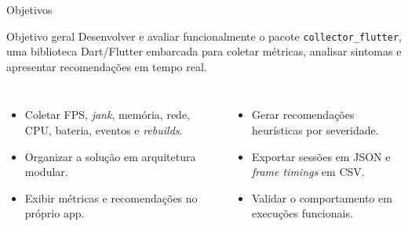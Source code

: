 \documentclass[aspectratio=169,10pt]{beamer}
\newcommand{\collectorFlutter}{\texttt{collector\_flutter}}
\newcommand{\jank}{\textit{jank}}
\newcommand{\rebuilds}{\textit{rebuilds}}
\begin{document}
\begin{frame}{Objetivos}
\begin{accentbox}{Objetivo geral}
Desenvolver e avaliar funcionalmente o pacote \collectorFlutter{}, uma biblioteca Dart/Flutter embarcada para coletar métricas, analisar sintomas e apresentar recomendações em tempo real.
\end{accentbox}
\vspace{1mm}
\begin{columns}[T,onlytextwidth]
  \begin{itemize}
    \item Coletar FPS, \jank{}, memória, rede, CPU, bateria, eventos e \rebuilds{}.
    \item Organizar a solução em arquitetura modular.
    \item Exibir métricas e recomendações no próprio app.
  \end{itemize}
  \begin{itemize}
    \item Gerar recomendações heurísticas por severidade.
    \item Exportar sessões em JSON e \textit{frame timings} em CSV.
    \item Validar o comportamento em execuções funcionais.
  \end{itemize}
\end{columns}
\end{frame}
\end{document}
